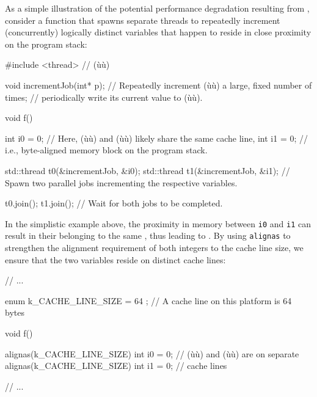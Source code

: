 As a simple illustration of the potential
performance degradation resulting from , consider
a function that spawns separate threads to repeatedly increment
(concurrently) logically distinct variables that happen to reside in
close proximity on the program stack:

\begin{emcppslisting}
#include <thread>  // (ù{}ù)

void incrementJob(int* p);
    // Repeatedly increment (ù{}ù) a large, fixed number of times;
    // periodically write its current value to (ù{}ù).

void f()
{
    int i0 = 0;  // Here, (ù{}ù) and (ù{}ù) likely share the same cache line,
    int i1 = 0;  // i.e., byte-aligned memory block on the program stack.

    std::thread t0(&incrementJob, &i0);
    std::thread t1(&incrementJob, &i1);
        // Spawn two parallel jobs incrementing the respective variables.

    t0.join();
    t1.join();
        // Wait for both jobs to be completed.
}
\end{emcppslisting}

\noindent In the simplistic example above, the proximity in memory between
\lstinline!i0! and \lstinline!i1! can result in their belonging to the same
, thus leading to . By
using \lstinline!alignas! to strengthen the alignment requirement of both integers to the cache line size, we
ensure that the two variables reside on distinct cache lines:

%
%
\begin{emcppslisting}[emcppsbatch=e2]
// ...

enum { k_CACHE_LINE_SIZE = 64 };  // A cache line on this platform is 64 bytes

void f()
{
    alignas(k_CACHE_LINE_SIZE) int i0 = 0; // (ù{}ù) and (ù{}ù) are on separate
    alignas(k_CACHE_LINE_SIZE) int i1 = 0; // cache lines

    // ...
}
\end{emcppslisting}

